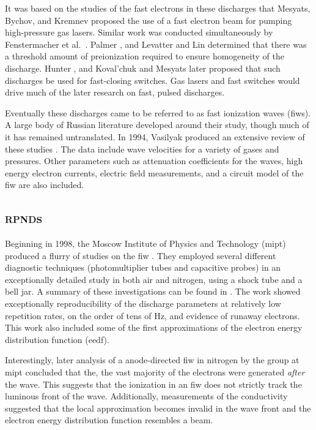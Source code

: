 It was based on the studies of the fast electrons in these discharges that
Mesyats, Bychov, and Kremnev proposed the use of a fast electron beam for
pumping high-pressure gas lasers. Similar work was conducted simultaneously by
Fenstermacher et al.~\cite{Fenstermacher1972}. Palmer \cite{Palmer1974}, and
Levatter and Lin \cite{Levatter1980} determined that there was a threshold
amount of preionization required to ensure homogeneity of the discharge. Hunter
\cite{Hunter1976}, and Koval'chuk and Mesyats \cite{Koval'chuk1976} later
proposed that such discharges be used for fast-closing switches. Gas lasers and
fast switches would drive much of the later research on fast, pulsed discharges.

Eventually these discharges came to be referred to as fast ionization waves
(\acs{fiw}s). A large body of Russian literature developed around their study,
though much of it has remained untranslated. In 1994, Vasilyak produced an
extensive review of these studies \cite{Vasilyak1994}. The data include wave
velocities for a variety of gases and pressures. Other parameters such as
attenuation coefficients for the waves, high energy electron currents, electric
field measurements, and a circuit model of the \acs{fiw} are also included.

\subsection{\textsc{rpnd}s}

Beginning in 1998, the Moscow Institute of Physics and Technology (\acs{mipt})
produced a flurry of studies on the \acs{fiw} \cite{Anikin1998, Pancheshnyi1998,
Starikovskaia1998}. They employed several different diagnostic techniques
(photomultiplier tubes and capacitive probes) in an exceptionally detailed study
in both air and nitrogen, using a shock tube and a bell jar. A summary of these
investigations can be found in \cite{Starikovskaia2001}. The work showed
exceptionally reproducibility of the discharge parameters at relatively low
repetition rates, on the order of tens of Hz, and evidence of runaway electrons.
This work also included some of the first approximations of the electron energy
distribution function (\acs{eedf}).

Interestingly, later analysis of a anode-directed \acs{fiw} in nitrogen by the
group at \acs{mipt} \cite{Pancheshnyi1999} concluded that the, the vast majority
of the electrons were generated \emph{after} the wave. This suggests that the
ionization in an \acs{fiw} does not strictly track the luminous front of the
wave. Additionally, measurements of the conductivity suggested that the local
approximation becomes invalid in the wave front and the electron energy
distribution function resembles a beam.

